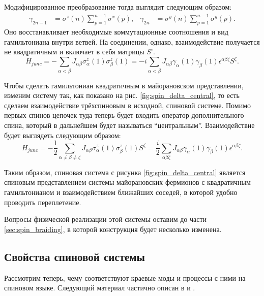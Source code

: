 \documentclass[a4paper,12pt]{article}
\theoremstyle{plain} %
\theoremstyle{definition} %
\theoremstyle{remark} %
\begin{document}
Модифицированное преобразование тогда выглядит следующим образом:
\begin{align}
    \gamma_{2n-1} &= \sigma^z (n) \sum\limits_{p=1}^{n-1} \sigma^x (p), & 
    \gamma_{2n} &= \sigma^y (n) \sum\limits_{p=1}^{n-1} \sigma^y (p).
\end{align}
Оно восстанавливает необходимые коммутационные соотношения и вид гамильтониана внутри ветвей. На соединении, однако, взаимодействие получается не квадратичным и включает в себя матрицы $S^i$.
\begin{equation}
    H_{junc} = - \sum\limits_{\alpha < \beta} J_{\alpha \beta} \sigma_\alpha^z (1) \sigma_\beta^z (1) = - i \sum\limits_{\alpha < \beta} J_{\alpha \beta} \gamma_\alpha (1) \gamma_\beta (1) \epsilon^{\alpha \beta \zeta} S^\zeta.
\end{equation}

Чтобы сделать гамильтониан квадратичным в майорановском представлении, изменим систему так, как показано на рис. \ref{fig:spin_delta_central}, то есть сделаем взаимодействие трёхспиновым в исходной, спиновой системе. Помимо первых спинов цепочек туда теперь будет входить оператор дополнительного спина, который в дальнейшем будет называться ``центральным''. Взаимодействие будет выглядеть следующим образом:
\begin{equation}
    H_{junc} = - \frac{1}{2} \sum\limits_{\alpha \neq \beta \neq \zeta} J_{\alpha \beta} \sigma_\alpha^z (1) \sigma_\beta^z (1) S^\zeta = \frac{i}{2} \sum\limits_{\alpha \beta \zeta} J_{\alpha \beta} \gamma_\alpha (1) \gamma_\beta (1) \epsilon^{\alpha \beta \zeta}.
    \label{eq:junc_H}
\end{equation}

Таким образом, спиновая система с рисунка \ref{fig:spin_delta_central} является спиновым представлением системы майорановских фермионов с квадратичным гамильтонианом и взаимодействием ближайших соседей, в которой удобно проводить переплетение.

Вопросы физической реализации этой системы оставим до части \ref{sec:spin_braiding}, в которой конструкция будет несколько изменена. 

\pagebreak

\subsection{Свойства спиновой системы} \label{subsec:spin_properties}

Рассмотрим теперь, чему соответствуют краевые моды и процессы с ними на спиновом языке. Следующий материал частично описан в \cite{arrays} и \cite{main}.
\end{document}
